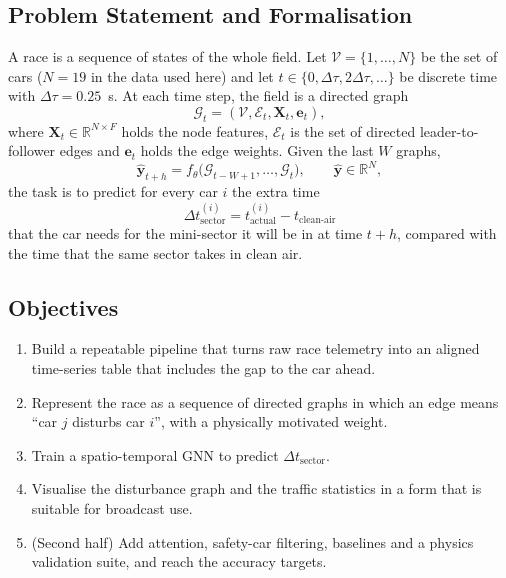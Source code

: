 \documentclass[11pt,a4paper]{article}
\begin{document}
\subsection{Problem Statement and Formalisation}
A race is a sequence of states of the whole field. Let
$\mathcal{V}=\{1,\dots,N\}$ be the set of cars ($N=19$ in the data used here)
and let $t \in \{0, \Delta\tau, 2\Delta\tau, \dots\}$ be discrete time with
$\Delta\tau = 0.25$~s. At each time step, the field is a directed graph
\begin{equation}
\mathcal{G}_t = (\mathcal{V}, \mathcal{E}_t, \mathbf{X}_t, \mathbf{e}_t),
\end{equation}
where $\mathbf{X}_t \in \mathbb{R}^{N\times F}$ holds the node features,
$\mathcal{E}_t$ is the set of directed leader-to-follower edges and
$\mathbf{e}_t$ holds the edge weights. Given the last $W$ graphs,
\begin{equation}
\hat{\mathbf{y}}_{t+h} = f_\theta\bigl(\mathcal{G}_{t-W+1},\dots,\mathcal{G}_t\bigr), \qquad \hat{\mathbf{y}}\in\mathbb{R}^{N},
\end{equation}
the task is to predict for every car $i$ the extra time
\begin{equation}
\Delta t^{(i)}_{\text{sector}} = t^{(i)}_{\text{actual}} - t_{\text{clean-air}}
\end{equation}
that the car needs for the mini-sector it will be in at time $t+h$, compared
with the time that the same sector takes in clean air.

\subsection{Objectives}
\begin{enumerate}[leftmargin=*]
  \item Build a repeatable pipeline that turns raw race telemetry into an
        aligned time-series table that includes the gap to the car ahead.
  \item Represent the race as a sequence of directed graphs in which an edge
        means ``car $j$ disturbs car $i$'', with a physically motivated weight.
  \item Train a spatio-temporal GNN to predict $\Delta t_{\text{sector}}$.
  \item Visualise the disturbance graph and the traffic statistics in a form
        that is suitable for broadcast use.
  \item (Second half) Add attention, safety-car filtering, baselines and a
        physics validation suite, and reach the accuracy targets.
\end{enumerate}
\end{document}

